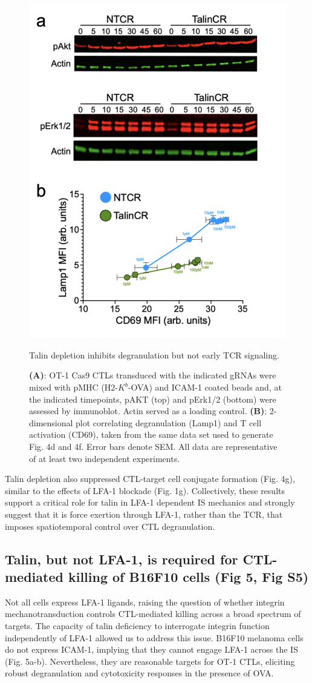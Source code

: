 \begin{figure}[htbp]
	\centering
	\includegraphics[width=0.8\columnwidth]{../figures/chapter3/fig4activation.png}
	\caption{Talin depletion inhibits degranulation but not early TCR signaling.}
	\caption*{\textbf{(A)}: OT-1 Cas9 CTLs transduced with the indicated gRNAs were mixed with pMHC (H2-$K^{b}$-OVA) and ICAM-1 coated beads and, at the indicated timepoints, pAKT (top) and pErk1/2 (bottom) were assessed by immunoblot. Actin served as a loading control. \textbf{(B)}: 2-dimensional plot correlating degranulation (Lamp1) and T cell activation (CD69), taken from the same data set used to generate Fig. 4d and 4f. Error bars denote SEM. All data are representative of at least two independent experiments.}
	\label{fig:fig4activation}
\end{figure} 

Talin depletion also suppressed CTL-target cell conjugate formation (Fig. 4g), similar to the effects of LFA-1 blockade (Fig. 1g). Collectively, these results support a critical role for talin in LFA-1 dependent IS mechanics and strongly suggest that it is force exertion through LFA-1, rather than the TCR, that imposes spatiotemporal control over CTL degranulation.

\subsection{Talin, but not LFA-1, is required for CTL-mediated killing of B16F10 cells (Fig 5, Fig S5)}
Not all cells express LFA-1 ligands, raising the question of whether integrin mechanotransduction controls CTL-mediated killing across a broad spectrum of targets. The capacity of talin deficiency to interrogate integrin function independently of LFA-1 allowed us to address this issue. B16F10 melanoma cells do not express ICAM-1, implying that they cannot engage LFA-1 across the IS (Fig. 5a-b). Nevertheless, they are reasonable targets for OT-1 CTLs, eliciting robust degranulation and cytotoxicity responses in the presence of OVA. 

